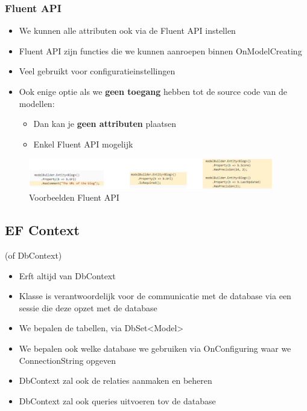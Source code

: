 \documentclass{article}
\begin{document}
\subsubsection{Fluent API}

\begin{itemize}
    \item We kunnen alle attributen ook via de Fluent API instellen
    \item Fluent API zijn functies die we kunnen aanroepen binnen OnModelCreating   
    \item Veel gebruikt voor configuratieinstellingen
    \item Ook enige optie als we \textbf{geen toegang} hebben tot de source code van de modellen:
    \begin{itemize}
        \item Dan kan je \textbf{geen attributen} plaatsen
        \item Enkel Fluent API mogelijk
    \end{itemize}
\end{itemize}

\begin{figure}[H]
    \centering
    \includegraphics[width=0.95\textwidth]{efcore-fluentapi.png}
    \caption{Voorbeelden Fluent API}
\end{figure}

\subsection{EF Context}

(of DbContext)

\begin{itemize}
    \item Erft altijd van DbContext
    \item Klasse is verantwoordelijk voor de communicatie met de database via een sessie die deze opzet met de database
    \item We bepalen de tabellen, via DbSet<Model>
    \item We bepalen ook welke database we gebruiken via OnConfiguring waar we ConnectionString opgeven
    \item DbContext zal ook de relaties aanmaken en beheren
    \item DbContext zal ook queries uitvoeren tov de database
\end{itemize}
\end{document}
